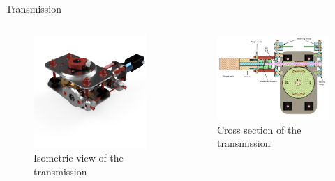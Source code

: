 \documentclass[11pt, aspectratio=169]{beamer}
\begin{document}
\begin{frame}{Transmission}
	\begin{columns}[t]
		\begin{column}{0.45\textwidth}
			\begin{figure}
				\centering
				\includegraphics[width=\textwidth]{figures/Mechanical/transmission.png}
				\caption{Isometric view of the transmission}
				\label{img::mech2}
			\end{figure}
		\end{column}
		\begin{column}{0.45\textwidth}
			\begin{figure}
				\centering
				\includegraphics[width=\textwidth]{figures/Mechanical/Wormshaft_CS.png}
				\caption{Cross section of the transmission}
				\label{img::mech3}
			\end{figure}
		\end{column}
	\end{columns}

\end{frame}
\end{document}
